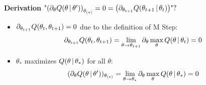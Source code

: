\begin{frame} [t]
      {\bf Derivation}
    $ \text{"}
        \qty  
        ( \partial _{\theta} 
          Q ( \theta \,\vert\, \theta^{\prime} )
        ) 
         _{\theta _{(*)}} 
        = 0
        =
        \qty  
        ( \partial _{\theta _{t+1}} Q 
          ( \theta _{t+1} \,\vert\, \theta _{t} )
        ) 
        \text{"?}
    $
    \begin{itemize}
     \item 
      $ \footnotesize
        \partial _{\theta _{t+1}} Q 
        (\theta _{t} , \theta _{t+1})
        = 0
      $ due to the definition of M Step: 
      {\footnotesize 
      \begin{align*}
        \partial _{\theta _{t+1}} Q 
        (\theta _{t} , \theta _{t+1})
       & = 
        \lim 
         _{\theta \rightarrow \theta _{t+1}}
        \partial _{\theta} 
        \max _{\theta}
        Q ( \theta \,\vert\, \theta _{t} )
      = 0
      \end{align*}
      }
     \item 
      $\theta _{*}$ maximizes 
      $ Q ( \theta \,\vert\, \theta _{*} ) 
      $ for all $\theta$:
      { \footnotesize
      \begin{align*}
        ( \partial _{\theta} 
          Q ( \theta \,\vert\, \theta^{\prime} )
        ) 
         _{\theta _{(*)}} 
      & = 
         \lim 
          _{ \theta
             \rightarrow \theta _{*}
           }
         \partial _{\theta} 
         \max _{\theta}
         Q ( \theta \,\vert\, \theta _{*} ) 
        = 0
      \end{align*}
      }
    \end{itemize}
\end{frame}


